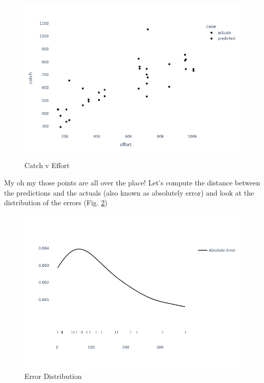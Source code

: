 \documentclass[11pt,a5paper]{book}
\begin{document}
\begin{figure}[h!] 
  \includegraphics[width=\linewidth]{notebooks/SurplusModels/model_scatter.png}
  \caption{Catch v Effort}
  \label{fig:predictions_surplus}
\end{figure}

My oh my those points are all over the place! Let's compute the distance between the predictions and the actuals (also known as absolutely error) and look at the distribution of the errors (Fig. \ref{fig:predictions_surplus_dist})
\newline

\begin{figure}[h!] 
  \includegraphics[width=\linewidth]{notebooks/SurplusModels/model_dist.png}
  \caption{Error Distribution}
  \label{fig:predictions_surplus_dist}
\end{figure}
\end{document}
